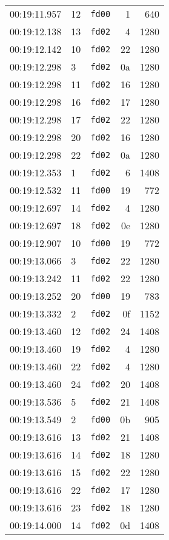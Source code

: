 \documentclass{article}
\begin{document}
\begin{longtable}{lllrr}
00:19:11.957 & 12 & \texttt{fd00} & 1 & 640 \\
00:19:12.138 & 13 & \texttt{fd02} & 4 & 1280 \\
00:19:12.142 & 10 & \texttt{fd02} & 22 & 1280 \\
00:19:12.298 & 3 & \texttt{fd02} & 0a & 1280 \\
00:19:12.298 & 11 & \texttt{fd02} & 16 & 1280 \\
00:19:12.298 & 16 & \texttt{fd02} & 17 & 1280 \\
00:19:12.298 & 17 & \texttt{fd02} & 22 & 1280 \\
00:19:12.298 & 20 & \texttt{fd02} & 16 & 1280 \\
00:19:12.298 & 22 & \texttt{fd02} & 0a & 1280 \\
00:19:12.353 & 1 & \texttt{fd02} & 6 & 1408 \\
00:19:12.532 & 11 & \texttt{fd00} & 19 & 772 \\
00:19:12.697 & 14 & \texttt{fd02} & 4 & 1280 \\
00:19:12.697 & 18 & \texttt{fd02} & 0e & 1280 \\
00:19:12.907 & 10 & \texttt{fd00} & 19 & 772 \\
00:19:13.066 & 3 & \texttt{fd02} & 22 & 1280 \\
00:19:13.242 & 11 & \texttt{fd02} & 22 & 1280 \\
00:19:13.252 & 20 & \texttt{fd00} & 19 & 783 \\
00:19:13.332 & 2 & \texttt{fd02} & 0f & 1152 \\
00:19:13.460 & 12 & \texttt{fd02} & 24 & 1408 \\
00:19:13.460 & 19 & \texttt{fd02} & 4 & 1280 \\
00:19:13.460 & 22 & \texttt{fd02} & 4 & 1280 \\
00:19:13.460 & 24 & \texttt{fd02} & 20 & 1408 \\
00:19:13.536 & 5 & \texttt{fd02} & 21 & 1408 \\
00:19:13.549 & 2 & \texttt{fd00} & 0b & 905 \\
00:19:13.616 & 13 & \texttt{fd02} & 21 & 1408 \\
00:19:13.616 & 14 & \texttt{fd02} & 18 & 1280 \\
00:19:13.616 & 15 & \texttt{fd02} & 22 & 1280 \\
00:19:13.616 & 22 & \texttt{fd02} & 17 & 1280 \\
00:19:13.616 & 23 & \texttt{fd02} & 18 & 1280 \\
00:19:14.000 & 14 & \texttt{fd02} & 0d & 1408 \\

\end{longtable}
\end{document}

